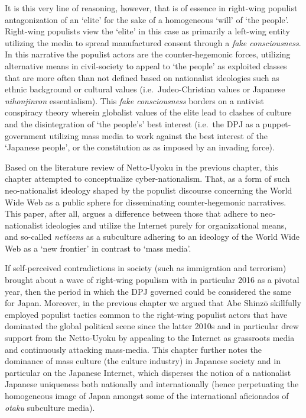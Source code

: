 \documentclass[10pt,british,A4paper,twoside]{memoir}
\begin{document}
It is this very line of reasoning, however, that is of essence in
right-wing populist antagonization of an `elite' for the sake of a
homogeneous `will' of `the people'. Right-wing populists view the
`elite' in this case as primarily a left-wing entity utilizing the media
to spread manufactured consent through a \emph{fake consciousness}. In
this narrative the populist actors are the counter-hegemonic forces,
utilizing alternative means in civil-society to appeal to `the people' as
exploited classes that are more often than not defined based on
nationalist ideologies such as ethnic background or cultural values
(i.e.~Judeo-Christian values or Japanese \emph{nihonjinron}
essentialism). This \emph{fake consciousness} borders on a nativist
conspiracy theory wherein globalist values of the elite lead to clashes
of culture and the disintegration of `the people's' best interest
(i.e.~the DPJ as a puppet-government utilizing mass media to work
against the best interest of the `Japanese people', or the constitution
as as imposed by an invading force).

Based on the literature review of Netto-Uyoku in the previous chapter,
this chapter attempted to conceptualize cyber-nationalism. That, as a
form of such neo-nationalist ideology shaped by the populist discourse
concerning the World Wide Web as a public sphere for disseminating
counter-hegemonic narratives. This paper, after all, argues a difference
between those that adhere to neo-nationalist ideologies and utilize the
Internet purely for organizational means, and so-called \emph{netizens}
as a subculture adhering to an ideology of the World Wide Web as a `new
frontier' in contrast to `mass media'.

If self-perceived contradictions in society (such as immigration and
terrorism) brought about a wave of right-wing populism with in
particular 2016 as a pivotal year, then the period in which the DPJ
governed could be considered the same for Japan. Moreover, in the
previous chapter we argued that Abe Shinzō skillfully employed populist
tactics common to the right-wing populist actors that have dominated the
global political scene since the latter 2010s and in particular drew
support from the Netto-Uyoku by appealing to the Internet as grassroots
media and continuously attacking mass-media. This chapter further notes
the dominance of mass culture (the culture industry) in Japanese society
and in particular on the Japanese Internet, which disperses the notion
of a nationalist Japanese uniqueness both nationally and internationally
(hence perpetuating the homogeneous image of Japan amongst some of the
international aficionados of \emph{otaku} subculture media).
\end{document}
